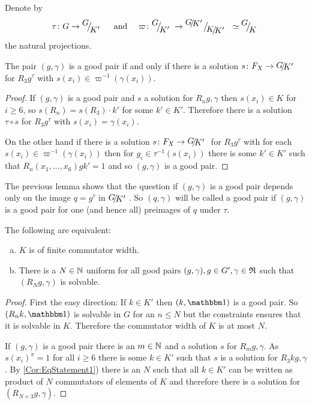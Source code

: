 \documentclass[a4paper,12pt]{article}
\begin{document}
\begin{lem}
 Denote by 
 \[\tau\colon G\to\RNK{G}{K'}\quad\text{ and }\quad\varpi\colon \RNK{G}{K'} \to \RNK{\RNK{G}{K'}}{\RNK{K}{K'}}\simeq \RNK{G}{K}\]
 the natural projections.
 
 The pair $(g,\gamma)$ is a good pair if and only if there is a solution $s\colon F_X \to \RNK{G}{K'}$ for $R_3g^\tau$ with $s(x_i) \in \varpi^{-1}(\gamma(x_i))$. 
\end{lem}
\begin{proof}
 If $(g,\gamma)$ is a good pair and $s$ a solution for $R_ng,\gamma$ 
 then $s(x_i)\in K$ for $i\geq6$, so $s(R_n) = s(R_3) \cdot k'$ for some $k'\in K'$. 
 Therefore there is a solution $\tau\circ s$ for $R_3g^\tau$ with $s(x_i) = \gamma(x_i)$.
 
 On the other hand if there is a solution $s\colon F_X \to \RNK{G}{K'}$ for $R_3g^\tau$ with for each $s(x_i) \in \varpi^{-1}(\gamma(x_i))$ then
 for $g_i \in \tau^{-1}(s(x_i))$ there is some $k'\in K'$ such that $R_n(x_1,\ldots,x_6)gk'=1$ and so $(g,\gamma)$ is a good pair.
\end{proof}
The previous lemma shows that the question if $(g,\gamma)$ is a good pair depends only on the image $q=g^\tau$ in $\RNK{G}{K'}$. So 
$(q,\gamma)$ will be called a good pair if $(g,\gamma)$ is a good pair for one (and hence all) preimages of $q$ under $\tau$.
\begin{cor}\label{cor:finiteCommutatorWidthKimpliesBoundedConstraintedCommutators}
The following are equivalent:
\begin{enumerate}[a)]
 \item $K$ is of finite commutator width. \label{Cor:EqStatement1}
 \item There is a $N\in\mathbb{N}$ uniform for all good pairs $(g,\gamma),g \in G',\gamma\in\mathfrak{R}$ such that $(R_Ng,\gamma)$ is solvable.
\end{enumerate}
\end{cor}
\begin{proof}
 First the easy direction: If $k\in K'$ then $(k,\id)$ is a good pair. So $(R_nk,\id)$ is solvable in $G$ for an $n\leq N$ but the constraints ensures that it is solvable in $K$.
 Therefore the commutator width of $K$ is at most $N$.
 
 If $(g,\gamma)$ is a good pair there is an $m\in \mathbb{N}$ and a solution $s$ for $R_mg,\gamma$. As $s(x_i)^\pi =1$ for all $i\geq 6$ there is some $k\in K'$ such that $s$ is 
 a solution for $R_3kg,\gamma$. By \ref{Cor:EqStatement1}) there is an $N$ such that all $k\in K'$ can be written as product of $N$ commutators of elements of $K$ and
 therefore there is a solution for $(R_{N+3}g,\gamma)$.
\end{proof}
\end{document}
